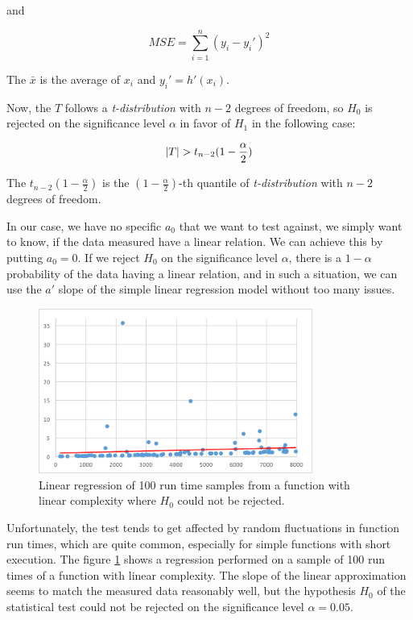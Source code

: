 and

\[MSE = { \sum_{i = 1}^{n} (y_i - y_i')^2 }\]

The \(\bar{x}\) is the average of \(x_i\) and \(y_i' = h'(x_i)\).

Now, the \(T\) follows a \textit{t-distribution} with \(n-2\) degrees of freedom, so \(H_0\) is rejected on the significance level $\alpha$ in favor of $H_1$ in the following case:

\[\left|{T}\right| > t_{n - 2}(1-\frac{\alpha}{2})\]

The $t_{n - 2}(1-\frac{\alpha}{2})$ is the $(1-\frac{\alpha}{2})$-th quantile of \textit{t-distribution} with $n-2$ degrees of freedom.

In our case, we have no specific $a_0$ that we want to test against, we simply want to know, if the data measured have a linear relation. We can achieve this by putting $a_0 = 0$. If we reject $H_0$ on the significance level $\alpha$, there is a $1 - \alpha$ probability of the data having a linear relation, and in such a situation, we can use the $a'$ slope of the simple linear regression model without too many issues.

\begin{figure}[h!]
	\captionsetup{justification=centering,margin=0.5cm}
	\centerline{\mbox{\includegraphics[width=90mm]{./img/linear_cantreject.png}}}
	\caption{Linear regression of 100 run time samples from a function with linear complexity where $H_0$ could not be rejected.}
	\label{fig:linear_cantreject}
\end{figure}

Unfortunately, the test tends to get affected by random fluctuations in function run times, which are quite common, especially for simple functions with short execution. The figure \ref{fig:linear_cantreject} shows a regression performed on a sample of 100 run times of a function with linear complexity. The slope of the linear approximation seems to match the measured data reasonably well, but the hypothesis $H_0$ of the statistical test could not be rejected on the significance level $\alpha = 0.05$. 

